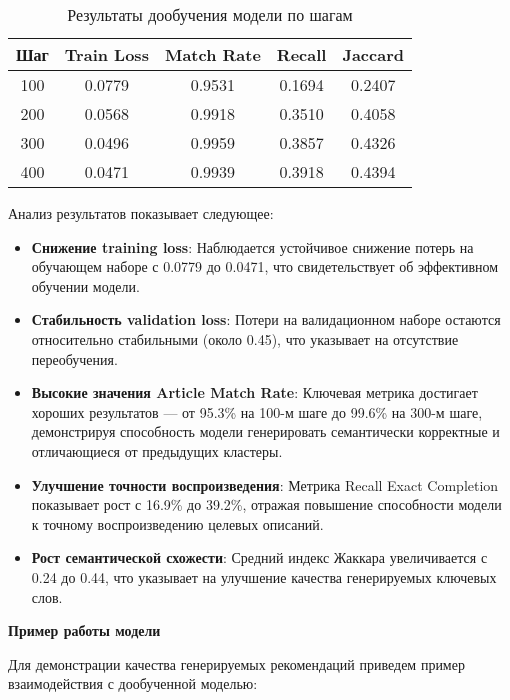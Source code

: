 \begin{table}[H]
\centering
\caption{Результаты дообучения модели по шагам}
\label{tab:training_results}
\small
\begin{tabular}{|c|c|c|c|c|}
\hline
\textbf{Шаг} & \textbf{Train Loss} & \textbf{Match Rate} & \textbf{Recall} & \textbf{Jaccard} \\
\hline
100 & 0.0779 & 0.9531 & 0.1694 & 0.2407 \\
\hline
200 & 0.0568 & 0.9918 & 0.3510 & 0.4058 \\
\hline
300 & 0.0496 & 0.9959 & 0.3857 & 0.4326 \\
\hline
400 & 0.0471 & 0.9939 & 0.3918 & 0.4394 \\
\hline
\end{tabular}
\end{table}

Анализ результатов показывает следующее:

\begin{itemize}
    \item \textbf{Снижение training loss}: Наблюдается устойчивое снижение потерь на обучающем наборе с 0.0779 до 0.0471, что свидетельствует об эффективном обучении модели.
    
    \item \textbf{Стабильность validation loss}: Потери на валидационном наборе остаются относительно стабильными (около 0.45), что указывает на отсутствие переобучения.
    
    \item \textbf{Высокие значения Article Match Rate}: Ключевая метрика достигает хороших результатов — от 95.3\% на 100-м шаге до 99.6\% на 300-м шаге, демонстрируя способность модели генерировать семантически корректные и отличающиеся от предыдущих кластеры.
    
    \item \textbf{Улучшение точности воспроизведения}: Метрика Recall Exact Completion показывает рост с 16.9\% до 39.2\%, отражая повышение способности модели к точному воспроизведению целевых описаний.
    
    \item \textbf{Рост семантической схожести}: Средний индекс Жаккара увеличивается с 0.24 до 0.44, что указывает на улучшение качества генерируемых ключевых слов.
\end{itemize}

\textbf{Пример работы модели}

Для демонстрации качества генерируемых рекомендаций приведем пример взаимодействия с дообученной моделью:

